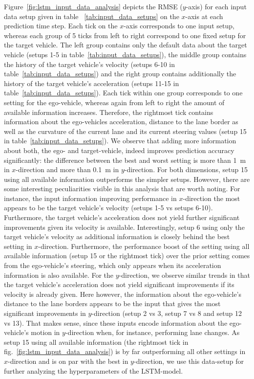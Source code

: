 Figure~\ref{fig:lstm_input_data_analysis} depicts the \ac{RMSE} ($y$-axis) for each input data setup given in table ~\ref{tab:input_data_setups} on the $x$-axis at each prediction time step.
Each tick on the $x$-axis corresponds to one input setup, whereas each group of \num{5} ticks from left to right correspond to one fixed setup for the target vehicle.
The left group contains only the default data about the target vehicle (setups \num{1}-\num{5} in table~\ref{tab:input_data_setups}), the middle group contains the history of the target vehicle's velocity (setups \num{6}-\num{10} in table~\ref{tab:input_data_setups}) and the right group contains additionally the history of the target vehicle's acceleration (setups \num{11}-\num{15} in table~\ref{tab:input_data_setups}).
Each tick within one group corresponds to one setting for the ego-vehicle, whereas again from left to right the amount of available information increases.
Therefore, the rightmost tick contains information about the ego-vehicles acceleration, distance to the lane border as well as the curvature of the current lane and its current steering values (setup \num{15} in table~\ref{tab:input_data_setups}). 
We observe that adding more information about both, the ego- and target-vehicle, indeed improves prediction accuracy significantly: the difference between the best and worst setting is more than \SI{1}{\meter} in $x$-direction and more than \SI{0.1}{\meter} in $y$-direction.
For both dimensions, setup \num{15} using all available information outperforms the simpler setups.
However, there are some interesting peculiarities visible in this analysis that are worth noting.
For instance, the input information improving performance in $x$-direction the most appears to be the target vehicle's velocity (setups \num{1}-\num{5} vs setups \num{6}-\num{10}). 
Furthermore, the target vehicle's acceleration does not yield further significant improvements given its velocity is available.
Interestingly, setup \num{6} using only the target vehicle's velocity as additional information is closely behind the best setting in $x$-direction.
Furthermore, the performance boost of the setting using all available information (setup \num{15} or the rightmost tick) over the prior setting comes from the ego-vehicle's steering, which only appears when its acceleration information is also available.
For the $y$-direction, we observe similar trends in that the target vehicle's acceleration does not yield significant improvements if its velocity is already given.
Here however, the information about the ego-vehicle's distance to the lane borders appears to be the input that gives the most significant improvements in $y$-direction (setup \num{2} vs \num{3}, setup \num{7} vs \num{8} and setup \num{12} vs \num{13}).
That makes sense, since these inputs encode information about the ego-vehicle's motion in $y$-direction when, for instance, performing lane changes.
As setup \num{15} using all available information (the rightmost tick in fig.~\ref{fig:lstm_input_data_analysis}) is by far outperforming all other settings in $x$-direction and is on par with the best in $y$-direction, we use this data-setup for further analyzing the hyperparameters of the \ac{LSTM}-model.

